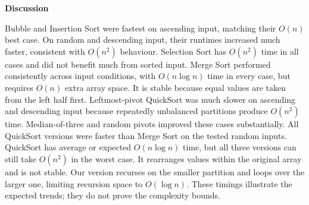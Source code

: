 \documentclass[11pt,a4paper]{article}
\begin{document}
\textbf{Discussion}

Bubble and Insertion Sort were fastest on ascending input, matching their
$O(n)$ best case. On random and descending input, their runtimes increased
much faster, consistent with $O(n^2)$ behaviour. Selection Sort has
$O(n^2)$ time in all cases and did not benefit much from sorted input.
Merge Sort performed consistently across input conditions, with
$O(n\log n)$ time in every case, but requires $O(n)$ extra array space.
It is stable because equal values are taken from the left half first.
Leftmost-pivot QuickSort was much slower on ascending and descending input
because repeatedly unbalanced partitions produce $O(n^2)$ time.
Median-of-three and random pivots improved these cases substantially.
All QuickSort versions were faster than Merge Sort on the tested random
inputs. QuickSort has average or expected $O(n\log n)$ time, but all three
versions can still take $O(n^2)$ in the worst case. It rearranges values
within the original array and is not stable. Our version recurses on the
smaller partition and loops over the larger one, limiting recursion space
to $O(\log n)$. These timings illustrate the expected trends; they do not
prove the complexity bounds.
\end{document}
